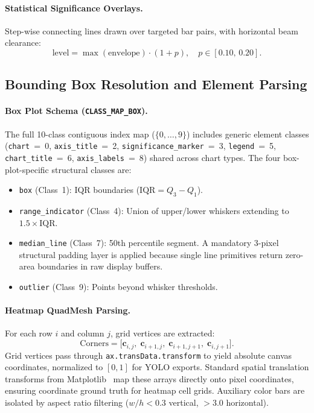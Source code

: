 \documentclass[11pt,twocolumn]{article}
\begin{document}
\paragraph{Statistical Significance Overlays.} Step-wise connecting lines drawn over targeted bar pairs, with horizontal beam clearance:
\begin{equation}\label{eq:sig_level}
  \text{level} = \max(\text{envelope})\cdot(1 + p),\quad p \in [0.10,\,0.20].
\end{equation}

\subsection{Bounding Box Resolution and Element Parsing}\label{sec:bbox}

\paragraph{Box Plot Schema (\texttt{CLASS\_MAP\_BOX}).}
The full 10-class contiguous index map ($\{0,\ldots,9\}$) includes generic element classes (\texttt{chart}~=~0, \texttt{axis\_title}~=~2, \texttt{significance\_marker}~=~3, \texttt{legend}~=~5, \texttt{chart\_title}~=~6, \texttt{axis\_labels}~=~8) shared across chart types.
The four box-plot-specific structural classes are:
\begin{itemize}[nosep]
  \item \texttt{box} (Class~1): IQR boundaries ($\text{IQR} = Q_3 - Q_1$).
  \item \texttt{range\_indicator} (Class~4): Union of upper/lower whiskers extending to $1.5\times\text{IQR}$.
  \item \texttt{median\_line} (Class~7): 50th percentile segment.
  A mandatory 3-pixel structural padding layer is applied because single line primitives return zero-area boundaries in raw display buffers.
  \item \texttt{outlier} (Class~9): Points beyond whisker thresholds.
\end{itemize}

\paragraph{Heatmap QuadMesh Parsing.}
For each row $i$ and column $j$, grid vertices are extracted:
\begin{equation}\label{eq:quad_corners}
  \text{Corners} = \bigl[\mathbf{c}_{i,j},\;\mathbf{c}_{i+1,j},\;\mathbf{c}_{i+1,j+1},\;\mathbf{c}_{i,j+1}\bigr].
\end{equation}
Grid vertices pass through \texttt{ax.transData.transform} to yield absolute canvas coordinates, normalized to $[0,1]$ for YOLO exports. Standard spatial translation transforms from Matplotlib~\cite{hunter2007matplotlib} map these arrays directly onto pixel coordinates, ensuring coordinate ground truth for heatmap cell grids. Auxiliary color bars are isolated by aspect ratio filtering ($w/h < 0.3$ vertical, $>3.0$ horizontal).
\end{document}
